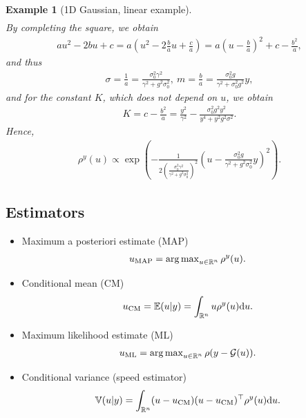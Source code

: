 \documentclass[oneside]{article}
\numberwithin{equation}{section}
\newtheorem{example}{Example}[section]
\begin{document}
\begin{example}[1D Gaussian, linear example]
\begin{align*}
    \end{align*}
    By completing the square, we obtain
    \begin{align*}
        au^2 - 2bu + c = a\left(u^2 - 2\frac{b}{a}u + \frac{c}{a}\right) = a\left(u - \frac{b}{a}\right)^2 + c - \frac{b^2}{a},
    \end{align*}
    and thus
    \begin{align*}
        \sigma = \frac{1}{a} = \frac{\sigma_0^2\gamma^2}{\gamma^2 + g^2\sigma_0^2},\ m = \frac{b}{a} = \frac{\sigma_0^2g}{\gamma^2 + \sigma_0^2g^2}y,
    \end{align*}
    and for the constant $K$, which does not depend on $u$, we obtain
    \begin{align*}
        K = c - \frac{b^2}{a} = \frac{y^2}{\gamma^2} - \frac{\sigma_0^2g^2y^2}{y^4 + y^2g^2\sigma^2}.
    \end{align*}
    Hence,
    \begin{align*}
        \rho^y(u)\propto\exp\left(-\frac{1}{2\left(\frac{\sigma_0^2\gamma^2}{\gamma^2 + g^2\sigma_0^2}\right)^2}\left(u - \frac{\sigma_0^2g}{\gamma^2 + g^2\sigma_0^2}y\right)^2\right).
    \end{align*}
\end{example}

\subsection{Estimators}
\begin{itemize}
    \item Maximum a posteriori estimate (MAP)
    \begin{align*}
        u_{\rm MAP} = \operatorname{arg\max}_{u\in\mathbb{R}^n} \rho^y(u).
    \end{align*}
    \item Conditional mean (CM)
    \begin{align*}
        u_{\rm CM} = \mathbb{E}(u|y) = \int_{\mathbb{R}^n} u\rho^y(u){\rm d}u.
    \end{align*}
    \item Maximum likelihood estimate (ML)
    \begin{align*}
        u_{\rm ML} = \operatorname{arg\max}_{u\in\mathbb{R}^n} \rho(y - \mathcal{G}(u)).
    \end{align*}
    \item Conditional variance (speed estimator)
    \begin{align*}
        \mathbb{V}(u|y) = \int_{\mathbb{R}^n} (u - u_{\rm CM})(u - u_{\rm CM})^\top\rho^y(u){\rm d}u.
    \end{align*}
\end{itemize}
\end{document}

